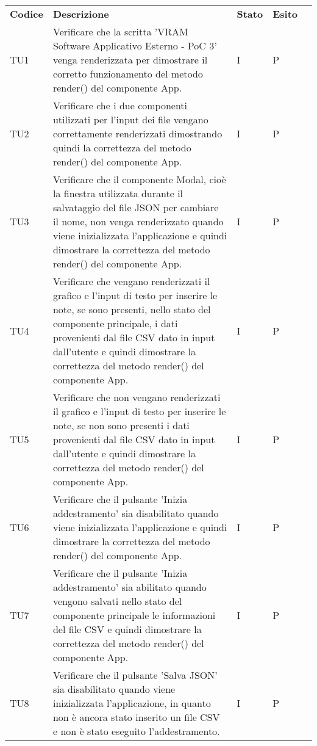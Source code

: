 \begin{longtable} {
		>{}p{15mm} 
		>{}p{79.5mm}
		>{}p{15mm} 
		>{}p{15mm}
		>{}p{0mm}}
	\rowcolor{gray!50}
	\textbf{Codice} & \textbf{Descrizione} & \textbf{Stato} & \textbf{Esito} &\TBstrut \\
	TU1		& Verificare che la scritta 'VRAM Software Applicativo Esterno - PoC 3' venga renderizzata per dimostrare il corretto funzionamento del metodo render() del componente App. & I & P &\TBstrut \\ [2mm]
	TU2		& Verificare che i due componenti utilizzati per l'input dei file vengano correttamente renderizzati dimostrando quindi la correttezza del metodo render() del componente App. & I & P &\TBstrut \\ [2mm]
	TU3		& Verificare che il componente Modal, cioè la finestra utilizzata durante il salvataggio del file JSON per cambiare il nome, non venga renderizzato quando viene inizializzata l'applicazione e quindi dimostrare la correttezza del metodo render() del componente App. & I & P &\TBstrut \\ [2mm]
	TU4		& Verificare che vengano renderizzati il grafico e l'input di testo per inserire le note, se sono presenti, nello stato del componente principale, i dati provenienti dal file CSV dato in input dall'utente e quindi dimostrare la correttezza del metodo render() del componente App. & I & P &\TBstrut \\ [2mm]
	TU5		& Verificare che non vengano renderizzati il grafico e l'input di testo per inserire le note, se non sono presenti i dati provenienti dal file CSV dato in input dall'utente e quindi dimostrare la correttezza del metodo render() del componente App. & I & P &\TBstrut \\ [2mm]
	TU6		& Verificare che il pulsante 'Inizia addestramento' sia disabilitato quando viene inizializzata l'applicazione e quindi dimostrare la correttezza del metodo render() del componente App. & I & P &\TBstrut \\ [2mm]
	TU7		& Verificare che il pulsante 'Inizia addestramento' sia abilitato quando vengono salvati nello stato del componente principale le informazioni del file CSV e quindi dimostrare la correttezza del metodo render() del componente App. & I & P &\TBstrut \\ [2mm]
	TU8		& Verificare che il pulsante 'Salva JSON' sia disabilitato quando viene inizializzata l'applicazione, in quanto non è ancora stato inserito un file CSV e non è stato eseguito l'addestramento. & I & P &\TBstrut \\ [2mm]

\end{longtable}
